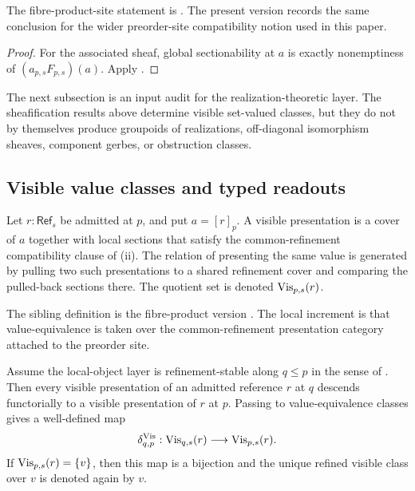 \begin{remark}
The fibre-product-site statement is
\cite[Corollary~4.8]{HomologicalVisibilityGluingObstructions2026}. The
present version records the same conclusion for the wider preorder-site
compatibility notion used in this paper.
\end{remark}

\begin{proof}
For the associated sheaf, global sectionability at $a$ is exactly nonemptiness
of $(a_{p,s}F_{p,s})(a)$. Apply
.
\end{proof}

The next subsection is an input audit for the realization-theoretic layer. The
sheafification results above determine visible set-valued classes, but they do
not by themselves produce groupoids of realizations, off-diagonal isomorphism
sheaves, component gerbes, or obstruction classes.



\subsection{Visible value classes and typed readouts}

\begin{definition}\label{def:visible-value-classes}
Let $r:\mathsf{Ref}_s$ be admitted at $p$, and put $a=[r]_p$. A visible
presentation is a cover of $a$ together with local sections that satisfy the
common-refinement compatibility clause of (ii). The
relation of presenting the same value is generated by pulling two such
presentations to a shared refinement cover and comparing the pulled-back
sections there. The quotient set is denoted $\mathrm{Vis}_{p,s}(r)$.
\end{definition}

\begin{remark}
The sibling definition is the fibre-product version
\cite[Definition~4.40]{HomologicalVisibilityGluingObstructions2026}. The local
increment is that value-equivalence is taken over the common-refinement
presentation category attached to the preorder site.
\end{remark}

\begin{lemma}\label{lem:refinement-descent-visible-classes}
Assume the local-object layer is refinement-stable along $q\le p$ in the sense
of . Then every visible
presentation of an admitted reference $r$ at $q$ descends functorially to a
visible presentation of $r$ at $p$. Passing to value-equivalence classes gives
a well-defined map
\[
\delta_{q,p}^{\mathrm{Vis}}:\mathrm{Vis}_{q,s}(r)\longrightarrow \mathrm{Vis}_{p,s}(r).
\]
If $\mathrm{Vis}_{p,s}(r)=\{v\}$, then this map is a bijection and the unique refined
visible class over $v$ is denoted again by $v$.
\end{lemma}

